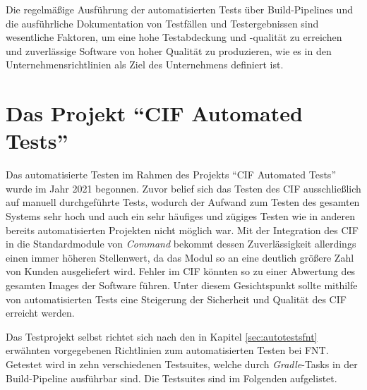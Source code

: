 Die regelmäßige Ausführung der automatisierten Tests über Build-Pipelines und die ausführliche Dokumentation von Testfällen und Testergebnissen sind wesentliche Faktoren, um eine hohe Testabdeckung und -qualität zu erreichen und zuverlässige Software von hoher Qualität zu produzieren, wie es in den Unternehmensrichtlinien als Ziel des Unternehmens definiert ist. \cite{fnt:2020}

\section{Das Projekt \enquote{CIF Automated Tests}}\label{sec:ciftestprojekt}
Das automatisierte Testen im Rahmen des Projekts \enquote{CIF Automated Tests} wurde im Jahr 2021 begonnen. Zuvor belief sich das Testen des \ac{CIF} ausschließlich auf manuell durchgeführte Tests, wodurch der Aufwand zum Testen des gesamten Systems sehr hoch und auch ein sehr häufiges und zügiges Testen wie in anderen bereits automatisierten Projekten nicht möglich war. Mit der Integration des \ac{CIF} in die Standardmodule von \textit{Command} bekommt dessen Zuverlässigkeit allerdings einen immer höheren Stellenwert, da das Modul so an eine deutlich größere Zahl von Kunden ausgeliefert wird. Fehler im \ac{CIF} könnten so zu einer Abwertung des gesamten Images der Software führen. Unter diesem Gesichtspunkt sollte mithilfe von automatisierten Tests eine Steigerung der Sicherheit und Qualität des \ac{CIF} erreicht werden.

Das Testprojekt selbst richtet sich nach den in Kapitel \ref{sec:autotestsfnt} erwähnten vorgegebenen Richtlinien zum automatisierten Testen bei FNT. Getestet wird in zehn verschiedenen Testsuites, welche durch \textit{Gradle}-Tasks in der Build-Pipeline ausführbar sind. Die Testsuites sind im Folgenden aufgelistet. 

